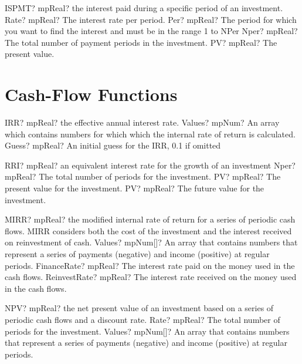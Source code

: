 \documentclass[12pt,a4paper,openany]{book}
\begin{document}
\begin{mpFunctionsExtract}
\mpWorksheetFunctionFourNotImplemented
{ISPMT? mpReal?  the interest paid during a specific period of an investment.}
{Rate? mpReal? The interest rate per period.}
{Per? mpReal? The period for which you want to find the interest and must be in the range 1 to NPer}
{Nper? mpReal? The total number of payment periods in the investment.}
{PV? mpReal? The present value.}
\end{mpFunctionsExtract}

\section{Cash-Flow Functions}

\begin{mpFunctionsExtract}
\mpWorksheetFunctionTwoNotImplemented
{IRR? mpReal? the effective annual interest rate.}
{Values? mpNum? An array which contains numbers for which which the internal rate of return is calculated.}
{Guess? mpReal? An initial guess for the IRR, 0.1 if omitted}
\end{mpFunctionsExtract}

\begin{mpFunctionsExtract}
\mpWorksheetFunctionThreeNotImplemented
{RRI? mpReal? an equivalent interest rate for the growth of an investment}
{Nper? mpReal? The total number of periods for the investment.}
{PV? mpReal? The present value for the investment.}
{PV? mpReal? The future value for the investment.}
\end{mpFunctionsExtract}

\begin{mpFunctionsExtract}
\mpWorksheetFunctionThreeNotImplemented
{MIRR? mpReal? the modified internal rate of return for a series of periodic cash flows. MIRR considers both the cost of the investment and the interest received on reinvestment of cash.}
{Values? mpNum[]? An array that contains numbers that represent a series of payments (negative) and income (positive) at regular periods.}
{FinanceRate? mpReal? The interest rate paid on the money used in the cash flows.}
{ReinvestRate? mpReal? The interest rate received on the money used in the cash flows.}
\end{mpFunctionsExtract}

\begin{mpFunctionsExtract}
\mpWorksheetFunctionTwoNotImplemented
{NPV? mpReal? the net present value of an investment based on a series of periodic cash flows and a discount rate.}
{Rate? mpReal? The total number of periods for the investment.}
{Values? mpNum[]? An array that contains numbers that represent a series of payments (negative) and income (positive) at regular periods.}
\end{mpFunctionsExtract}
\end{document}
